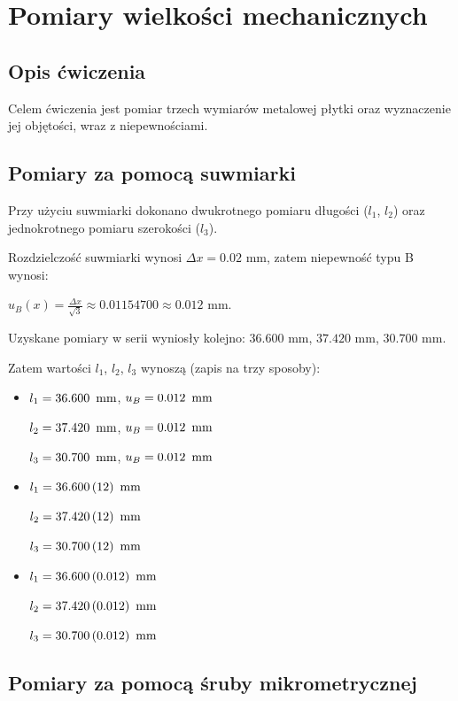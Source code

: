 \documentclass[a4paper]{article}
\begin{document}
\newpage

\section{Pomiary wielkości mechanicznych}

\subsection{Opis ćwiczenia}
Celem ćwiczenia jest pomiar trzech wymiarów metalowej płytki oraz wyznaczenie jej objętości, wraz z niepewnościami.

\subsection{Pomiary za pomocą suwmiarki}

Przy użyciu suwmiarki dokonano dwukrotnego pomiaru długości ($l_1$, $l_2$) oraz jednokrotnego pomiaru szerokości ($l_3$).

Rozdzielczość suwmiarki wynosi $\Delta x = 0.02$ mm, zatem niepewność typu B wynosi: 

$u_B(x) = \frac{\Delta x}{\sqrt{3}} \approx 0.01154700 \approx 0.012$ mm.

Uzyskane pomiary w serii wyniosły kolejno: $36.600$ mm, $37.420$ mm, $30.700$ mm.

Zatem wartości $l_1$, $l_2$, $l_3$ wynoszą (zapis na trzy sposoby):


\begin{itemize}
\item $l_1 = 36.600 \enskip \text{mm}$, $u_B = 0.012 \enskip \text{mm}$

$l_2 = 37.420 \enskip \text{mm}$, $u_B = 0.012 \enskip \text{mm}$

$l_3 = 30.700 \enskip \text{mm}$, $u_B = 0.012 \enskip \text{mm}$

\item $l_1 = 36.600 \, (12) \enskip \text{mm}$

$l_2 = 37.420 \, (12) \enskip \text{mm}$ 

$l_3 = 30.700 \, (12) \enskip \text{mm}$

\item $l_1 = 36.600 \, (0.012) \enskip \text{mm}$

$l_2 = 37.420 \, (0.012) \enskip \text{mm}$

$l_3 = 30.700 \, (0.012) \enskip \text{mm}$
\end{itemize}

\subsection{Pomiary za pomocą śruby mikrometrycznej}
\end{document}
